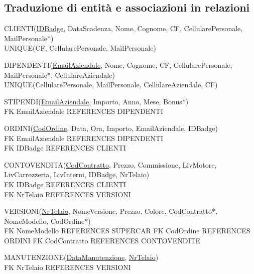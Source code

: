 \documentclass[11pt]{article}
\begin{document}
\newpage

\subsection{Traduzione di entità e associazioni in relazioni}

\small

\begin{flushleft}
CLIENTI(\underline{IDBadge}, DataScadenza, Nome, Cognome, CF,
    CellularePersonale, MailPersonale*)\\
UNIQUE(CF, CellularePersonale, MailPersonale)
\end{flushleft}
    

\begin{flushleft}
DIPENDENTI(\underline{EmailAziendale}, Nome, Cognome, CF, CellularePersonale,
MailPersonale*, CellulareAziendale)\\
UNIQUE(CellularePersonale, MailPersonale, CellulareAziendale, CF)
\end{flushleft}

\begin{flushleft}
STIPENDI(\underline{EmailAziendale}, Importo, Anno, Mese, Bonus*)\\
FK EmailAziendale REFERENCES DIPENDENTI
\end{flushleft}

\begin{flushleft}
ORDINI(\underline{CodOrdine}, Data, Ora, Importo, EmailAziendale, IDBadge)\\
FK EmailAziendale REFERENCES DIPENDENTI\\
FK IDBadge REFERENCES CLIENTI
\end{flushleft}

\begin{flushleft}
CONTOVENDITA(\underline{CodContratto}, Prezzo, Commissione, LivMotore,
LivCarrozzeria, LivInterni, IDBadge, NrTelaio)\\
FK IDBadge REFERENCES CLIENTI\\
FK NrTelaio REFERENCES VERSIONI
\end{flushleft}

\begin{flushleft}
VERSIONI(\underline{NrTelaio}, NomeVersione, Prezzo, Colore, CodContratto*, NomeModello, CodOrdine*)\\
FK NomeModello REFERENCES SUPERCAR
FK CodOrdine REFERENCES ORDINI
FK CodContratto REFERENCES CONTOVENDITE
\end{flushleft}

\begin{flushleft}
MANUTENZIONE(\underline{DataManutenzione}, \underline{NrTelaio})\\
FK NrTelaio REFERENCES VERSIONI
\end{flushleft}
\end{document}
